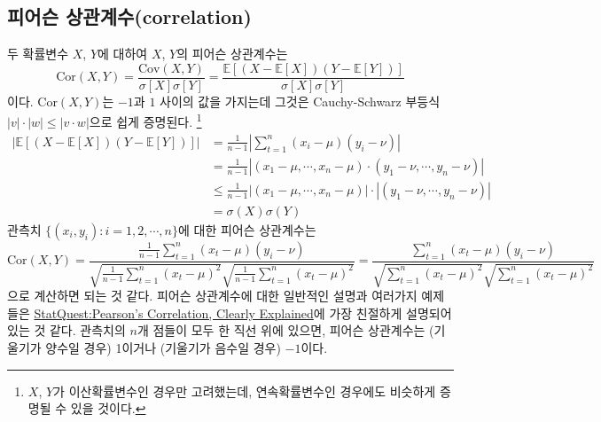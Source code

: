 \documentclass{article}
\begin{document}
\subsection{피어슨 상관계수(correlation)}
두 확률변수 \(X\), \(Y\)에 대하여 \(X\), \(Y\)의 피어슨 상관계수는 
\begin{equation}\label{pearson1}
\text{Cor}(X,Y)=\frac{\text{Cov}(X,Y)}{\sigma[X]\sigma[Y]}=\frac{\mathbb E[(X-\mathbb E[X])(Y-\mathbb E[Y])]}{\sigma[X]\sigma[Y]}
\end{equation}
이다.
\(\text{Cor}(X,Y)\)는 \(-1\)과 \(1\) 사이의 값을 가지는데 그것은 Cauchy-Schwarz 부등식 \(|v|\cdot|w|\le|v\cdot w|\)으로 쉽게 증명된다.
\footnote{\(X\), \(Y\)가 이산확률변수인 경우만 고려했는데, 연속확률변수인 경우에도 비슷하게 증명될 수 있을 것이다.}
\begin{align*}
\bigg|\mathbb E\left[\left(X-\mathbb E[X]\right)\left(Y-\mathbb E[Y]\right)\right]\bigg|
&=\frac1{n-1}\left|\sum_{t=1}^n(x_i-\mu)(y_i-\nu)\right|\\
&=\frac1{n-1}\left|(x_1-\mu,\cdots,x_n-\mu)\cdot(y_1-\nu,\cdots,y_n-\nu)\right|\\
&\le\frac1{n-1}\left|(x_1-\mu,\cdots,x_n-\mu)\right|\cdot\left|(y_1-\nu,\cdots,y_n-\nu)\right|\\
&=\sigma(X)\sigma(Y)
\end{align*}
관측치 \(\{(x_i, y_i):i=1,2,\cdots,n\}\)에 대한 피어슨 상관계수는
\begin{equation}\label{pearson2}
\text{Cor}(X,Y)
=\frac{\frac1{n-1}\sum_{t=1}^n(x_t-\mu)(y_i-\nu)}{\sqrt{\frac1{n-1}\sum_{t=1}^n(x_t-\mu)^2}\sqrt{\frac1{n-1}\sum_{t=1}^n(x_t-\mu)^2}}
=\frac{\sum_{t=1}^n(x_t-\mu)(y_i-\nu)}{\sqrt{\sum_{t=1}^n(x_t-\mu)^2}\sqrt{\sum_{t=1}^n(x_t-\mu)^2}}
\end{equation}
으로 계산하면 되는 것 같다.
피어슨 상관계수에 대한 일반적인 설명과 여러가지 예제들은 \href{https://youtu.be/xZ_z8KWkhXE}{StatQuest:Pearson's Correlation, Clearly Explained}에 가장 친절하게 설명되어 있는 것 같다.
관측치의 \(n\)개 점들이 모두 한 직선 위에 있으면, 피어슨 상관계수는 (기울기가 양수일 경우) 1이거나 (기울기가 음수일 경우) $-1$이다.

\end{document}

